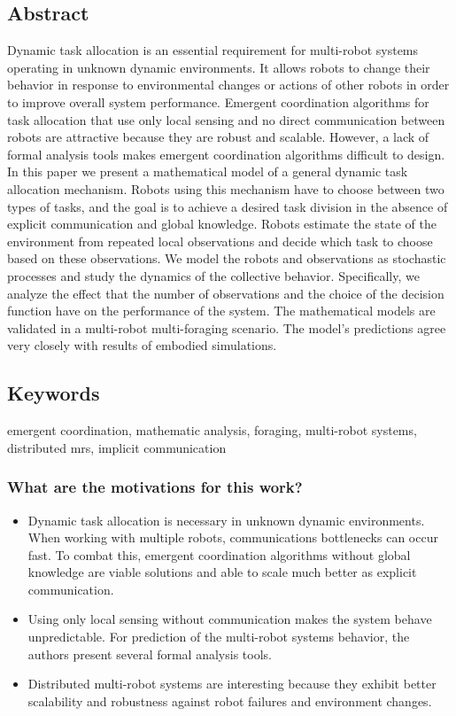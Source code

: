     \subsection*{Abstract}
    Dynamic task allocation is an essential requirement for multi-robot
    systems operating in unknown dynamic environments. It allows
    robots to change their behavior in response to environmental changes
    or actions of other robots in order to improve overall system performance. Emergent coordination algorithms for task allocation that
    use only local sensing and no direct communication between robots
    are attractive because they are robust and scalable. However, a lack
    of formal analysis tools makes emergent coordination algorithms
    difficult to design. In this paper we present a mathematical model
    of a general dynamic task allocation mechanism. Robots using this
    mechanism have to choose between two types of tasks, and the goal
    is to achieve a desired task division in the absence of explicit communication and global knowledge. Robots estimate the state of the
    environment from repeated local observations and decide which task
    to choose based on these observations. We model the robots and observations as stochastic processes and study the dynamics of the collective behavior. Specifically, we analyze the effect that the number
    of observations and the choice of the decision function have on the
    performance of the system. The mathematical models are validated
    in a multi-robot multi-foraging scenario. The model’s predictions
    agree very closely with results of embodied simulations.
    
    \subsection*{Keywords}
    emergent coordination, mathematic analysis, foraging, multi-robot systems, distributed mrs, implicit communication
    
     
    \subsubsection*{What are the motivations for this work?}
    \begin{itemize}
        \item Dynamic task allocation is necessary in unknown dynamic environments. When working with multiple robots, communications bottlenecks can occur fast. To combat this, emergent coordination algorithms without global knowledge are viable solutions and able to scale much better as explicit communication.
        \item Using only local sensing without communication makes the system behave unpredictable. For prediction of the multi-robot systems behavior, the authors present several formal analysis tools. 
        \item Distributed multi-robot systems are interesting because they exhibit better scalability and robustness against robot failures and environment changes. 
    \end{itemize}
